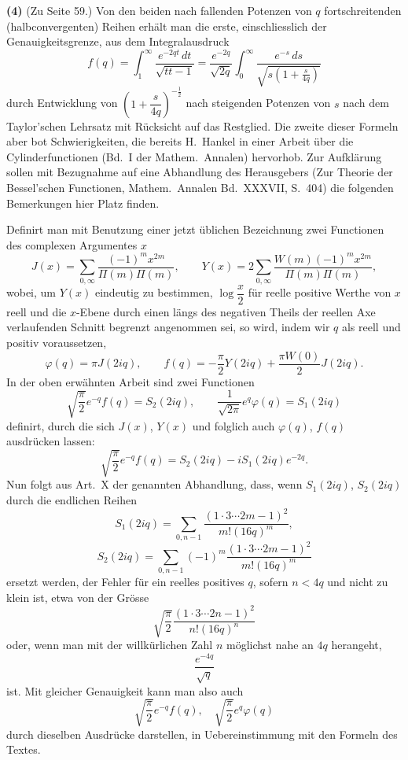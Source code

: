 \documentclass[12pt,a4paper]{book}
\theoremstyle{definition}
\theoremstyle{remark}
\begin{document}
\textbf{(4)} (Zu Seite 59.) Von den beiden nach fallenden Potenzen von $q$ fortschreitenden (halbconvergenten) Reihen erhält man die erste, einschliesslich der Genauigkeitsgrenze, aus dem Integralausdruck
\[
f(q) = \int_1^{\infty} \frac{e^{-2qt}\, dt}{\sqrt{tt-1}} = \frac{e^{-2q}}{\sqrt{2q}} \int_0^{\infty} \frac{e^{-s}\, ds}{\sqrt{s(1+\frac{s}{4q})}}
\]
durch Entwicklung von $\left(1 + \dfrac{s}{4q}\right)^{-\frac{1}{2}}$ nach steigenden Potenzen von $s$ nach dem Taylor'schen Lehrsatz mit Rücksicht auf das Restglied. Die zweite dieser Formeln aber bot Schwierigkeiten, die bereits H.~Hankel in einer Arbeit über die Cylinderfunctionen (Bd.~I der Mathem.\ Annalen) hervorhob. Zur Aufklärung sollen mit Bezugnahme auf eine Abhandlung des Herausgebers (Zur Theorie der Bessel'schen Functionen, Mathem.\ Annalen Bd.~XXXVII, S.~404) die folgenden Bemerkungen hier Platz finden.

Definirt man mit Benutzung einer jetzt üblichen Bezeichnung zwei Functionen des complexen Argumentes $x$
\[
J(x) = \sum_{0,\infty} \frac{(-1)^m x^{2m}}{\Pi(m)\Pi(m)}, \qquad
Y(x) = 2\sum_{0,\infty} \frac{W(m)(-1)^m x^{2m}}{\Pi(m)\Pi(m)},
\]
wobei, um $Y(x)$ eindeutig zu bestimmen, $\log \dfrac{x}{2}$ für reelle positive Werthe von $x$ reell und die $x$-Ebene durch einen längs des negativen Theils der reellen Axe verlaufenden Schnitt begrenzt angenommen sei, so wird, indem wir $q$ als reell und positiv voraussetzen,
\[
\varphi(q) = \pi J(2iq), \qquad f(q) = -\frac{\pi}{2} Y(2iq) + \frac{\pi W(0)}{2} J(2iq).
\]
In der oben erwähnten Arbeit sind zwei Functionen
\[
\sqrt{\frac{\pi}{2}} e^{-q} f(q) = S_2(2iq), \qquad
\frac{1}{\sqrt{2\pi}} e^{q} \varphi(q) = S_1(2iq)
\]
definirt, durch die sich $J(x)$, $Y(x)$ und folglich auch $\varphi(q)$, $f(q)$ ausdrücken lassen:
\[
\sqrt{\frac{\pi}{2}} e^{-q} f(q) = S_2(2iq) - iS_1(2iq) e^{-2q}.
\]
Nun folgt aus Art.~X der genannten Abhandlung, dass, wenn $S_1(2iq)$, $S_2(2iq)$ durch die endlichen Reihen
\[
S_1(2iq) = \sum_{0,n-1} \frac{(1 \cdot 3 \cdots 2m - 1)^2}{m! (16q)^m},
\]
\[
S_2(2iq) = \sum_{0,n-1} (-1)^m \frac{(1 \cdot 3 \cdots 2m - 1)^2}{m! (16q)^m}
\]
ersetzt werden, der Fehler für ein reelles positives $q$, sofern $n < 4q$ und nicht zu klein ist, etwa von der Grösse
\[
\sqrt{\frac{\pi}{2}} \frac{(1 \cdot 3 \cdots 2n - 1)^2}{n! (16q)^n}
\]
oder, wenn man mit der willkürlichen Zahl $n$ möglichst nahe an $4q$ herangeht,
\[
\frac{e^{-4q}}{\sqrt{q}}
\]
ist. Mit gleicher Genauigkeit kann man also auch
\[
\sqrt{\frac{\pi}{2}} e^{-q} f(q), \quad \sqrt{\frac{\pi}{2}} e^{q} \varphi(q)
\]
durch dieselben Ausdrücke darstellen, in Uebereinstimmung mit den Formeln des Textes.
\end{document}
